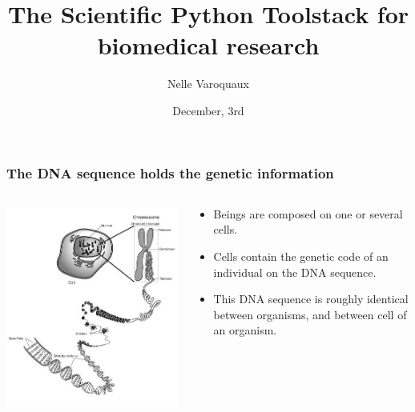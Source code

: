 \documentclass[xcolor=dvipsnames]{beamer}
\title{\textbf{The Scientific Python Toolstack for biomedical research}}
\author[Varoquaux Nelle]{
Nelle Varoquaux}
\date{December, 3rd}
\institute{Mines ParisTech, Institut Curie, INSERM}
\begin{document}
\begin{frame}[t, noframenumbering]
  \maketitle

\end{frame}

\setcounter{framenumber}{0}

\begin{frame}
\frametitle{The DNA sequence holds the genetic information}
\begin{columns}
\begin{column}{0.45\linewidth}
\includegraphics[width=\linewidth]{images/bio_101.png}
\end{column}
\begin{column}{0.45\linewidth}
\begin{itemize}[label={$\bullet$}]
\item Beings are composed on one or several cells.
\item Cells contain the genetic code of an individual on the DNA sequence.
\item This DNA sequence is roughly identical between organisms, and between cell of an organism.
\end{itemize}
\end{column}
\end{columns}
\end{frame}
\end{document}
